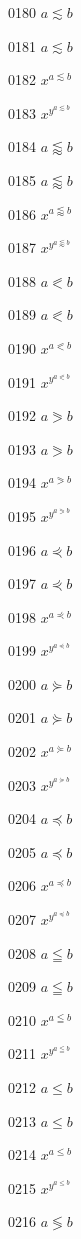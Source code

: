 \documentclass{article}
\begin{document}
0180 $a\lesssim b$\par
0181 $\displaystyle a\lesssim b$\par
0182 $x^{a\lesssim b}$\par
0183 $x^{y^{a\lesssim b}}$\par
0184 $a\lessapprox b$\par
0185 $\displaystyle a\lessapprox b$\par
0186 $x^{a\lessapprox b}$\par
0187 $x^{y^{a\lessapprox b}}$\par
0188 $a\eqslantless b$\par
0189 $\displaystyle a\eqslantless b$\par
0190 $x^{a\eqslantless b}$\par
0191 $x^{y^{a\eqslantless b}}$\par
0192 $a\eqslantgtr b$\par
0193 $\displaystyle a\eqslantgtr b$\par
0194 $x^{a\eqslantgtr b}$\par
0195 $x^{y^{a\eqslantgtr b}}$\par
0196 $a\curlyeqprec b$\par
0197 $\displaystyle a\curlyeqprec b$\par
0198 $x^{a\curlyeqprec b}$\par
0199 $x^{y^{a\curlyeqprec b}}$\par
0200 $a\curlyeqsucc b$\par
0201 $\displaystyle a\curlyeqsucc b$\par
0202 $x^{a\curlyeqsucc b}$\par
0203 $x^{y^{a\curlyeqsucc b}}$\par
0204 $a\preccurlyeq b$\par
0205 $\displaystyle a\preccurlyeq b$\par
0206 $x^{a\preccurlyeq b}$\par
0207 $x^{y^{a\preccurlyeq b}}$\par
0208 $a\leqq b$\par
0209 $\displaystyle a\leqq b$\par
0210 $x^{a\leqq b}$\par
0211 $x^{y^{a\leqq b}}$\par
0212 $a\leqslant b$\par
0213 $\displaystyle a\leqslant b$\par
0214 $x^{a\leqslant b}$\par
0215 $x^{y^{a\leqslant b}}$\par
0216 $a\lessgtr b$\par
\end{document}
